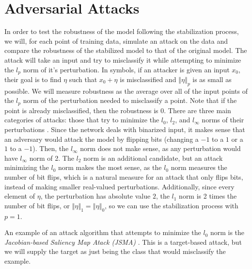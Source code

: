 \documentclass{article}
\newcommand{\norm}[1]{\left\Vert #1 \right\Vert}
\DeclareMathOperator{\1}{\mathbb{1}}
\begin{document}
\section{Adversarial Attacks}

In order to test the robustness of the model following the stabilization process, we will, for each point of training data, simulate an attack on the data and compare the robustness of the stabilized model to that of the original model. The attack will take an input and try to misclassify it while attempting to minimize the $l_p$ norm of it's perturbation. In symbols, if an attacker is given an input $x_0$, their goal is to find $\eta$ such that $x_0 + \eta$ is misclassified and $\norm{\eta}_p$ is as small as possible. We will measure robustness as the average over all of the input points of the $l_p$ norm of the perturbation needed to misclassify a point. Note that if the point is already misclassified, then the robustness is 0. There are three main categories of attacks: those that try to minimize the $l_0$, $l_2$, and $l_\infty$ norms of their perturbations \cite[p.~113]{vorobook}. Since the network deals with binarized input, it makes sense that an adversary would attack the model by flipping bits (changing a $-1$ to a $1$ or a $1$ to a $-1$). Then, the $l_\infty$ norm does not make sense, as any perturbation would have $l_\infty$ norm of 2. The $l_2$ norm is an additional candidate, but an attack minimizing the $l_0$ norm makes the most sense, as the $l_0$ norm measures the number of bit flips, which is a natural measure for an attack that only flips bits, instead of making smaller real-valued perturbations. Additionally, since every element of $\eta$, the perturbation has absolute value $2$, the $l_1$ norm is 2 times the number of bit flips, or $\norm{\eta}_1 = \norm{\eta}_0$, so we can use the stabilization process with $p = 1$.

An example of an attack algorithm that attempts to minimize the $l_0$ norm is the \textit{Jacobian-based Saliency Map Atack (JSMA)} \cite{papernot} \cite[p.~4]{ecocpaper}. This is a target-based attack, but we will supply the target as just being the class that would misclassify the example.
\end{document}
